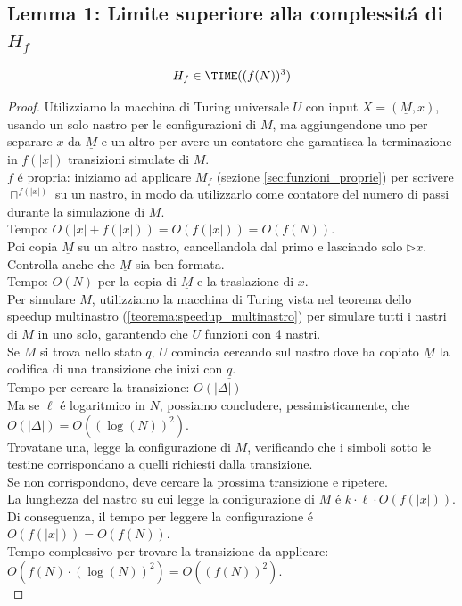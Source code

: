 \subsection{Lemma 1: Limite superiore alla complessitá di $H_f$}
\[H_f \in \TIME((f(N))^3)\]
\begin{proof}
Utilizziamo la macchina di Turing universale $U$ con input $X = (\underline{M}, x)$, usando un solo nastro per le configurazioni di $M$,
ma aggiungendone uno per separare $x$ da $\underline{M}$ 
e un altro per avere un contatore che garantisca la terminazione 
in $f(|x|)$ transizioni simulate di $M$. \\

$f$ é propria: iniziamo ad applicare $M_f$ (sezione \ref{sec:funzioni_proprie}) per scrivere $\sqcap^{f(|x|)}$ su un nastro, 
in modo da utilizzarlo come contatore del numero di passi durante la simulazione di $M$. \\
Tempo: $O(|x| + f(|x|)) = O(f(|x|)) = O(f(N))$. \\

Poi copia $\underline{M}$ su un altro nastro, cancellandola dal primo e lasciando solo $\triangleright x$. \\
Controlla anche che $\underline{M}$ sia ben formata. \\
Tempo: $O(N)$ per la copia di $\underline{M}$ e la traslazione di $x$. \\

Per simulare $M$, utilizziamo la macchina di Turing vista nel teorema dello speedup multinastro (\ref{teorema:speedup_multinastro}) 
per simulare tutti i nastri di $M$ in uno solo, garantendo che $U$ funzioni con 4 nastri. \\

Se $M$ si trova nello stato $q$, $U$ comincia cercando sul nastro dove ha copiato $\underline{M}$ la codifica di una transizione che inizi con $\underline{q}$.\\
Tempo per cercare la transizione: $O(|\Delta|)$ \\
Ma se $\ell$ é logaritmico in $N$, possiamo concludere, pessimisticamente, che 
$O(|\Delta|) = O((\log(N))^2)$. \\

Trovatane una, legge la configurazione di $M$, verificando che i simboli sotto le testine corrispondano a quelli richiesti dalla transizione. \\
Se non corrispondono, deve cercare la prossima transizione e ripetere. \\
La lunghezza del nastro su cui legge la configurazione di $M$ é $k \cdot \ell \cdot O(f(|x|))$.
Di conseguenza, il tempo per leggere la configurazione é $O(f(|x|)) = O(f(N))$.\\
Tempo complessivo per trovare la transizione da applicare: $O(f(N) \cdot (\log(N))^2) = O((f(N))^2)$.\\


\end{proof}

